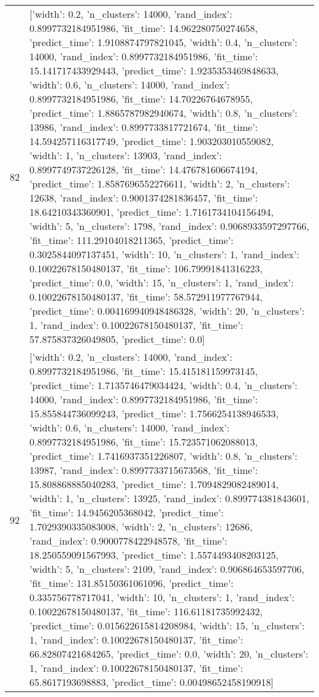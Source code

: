\begin{tabular}{rl}
82 & [{'width': 0.2, 'n_clusters': 14000, 'rand_index': 0.8997732184951986, 'fit_time': 14.962280750274658, 'predict_time': 1.9108874797821045}, {'width': 0.4, 'n_clusters': 14000, 'rand_index': 0.8997732184951986, 'fit_time': 15.141717433929443, 'predict_time': 1.9235353469848633}, {'width': 0.6, 'n_clusters': 14000, 'rand_index': 0.8997732184951986, 'fit_time': 14.70226764678955, 'predict_time': 1.8865787982940674}, {'width': 0.8, 'n_clusters': 13986, 'rand_index': 0.8997733817721674, 'fit_time': 14.594257116317749, 'predict_time': 1.903203010559082}, {'width': 1, 'n_clusters': 13903, 'rand_index': 0.8997749737226128, 'fit_time': 14.476781606674194, 'predict_time': 1.8587696552276611}, {'width': 2, 'n_clusters': 12638, 'rand_index': 0.9001374281836457, 'fit_time': 18.64210343360901, 'predict_time': 1.7161734104156494}, {'width': 5, 'n_clusters': 1798, 'rand_index': 0.9068933597297766, 'fit_time': 111.29104018211365, 'predict_time': 0.3025844097137451}, {'width': 10, 'n_clusters': 1, 'rand_index': 0.10022678150480137, 'fit_time': 106.79991841316223, 'predict_time': 0.0}, {'width': 15, 'n_clusters': 1, 'rand_index': 0.10022678150480137, 'fit_time': 58.572911977767944, 'predict_time': 0.004169940948486328}, {'width': 20, 'n_clusters': 1, 'rand_index': 0.10022678150480137, 'fit_time': 57.875837326049805, 'predict_time': 0.0}] \\
92 & [{'width': 0.2, 'n_clusters': 14000, 'rand_index': 0.8997732184951986, 'fit_time': 15.415181159973145, 'predict_time': 1.7135746479034424}, {'width': 0.4, 'n_clusters': 14000, 'rand_index': 0.8997732184951986, 'fit_time': 15.855844736099243, 'predict_time': 1.7566254138946533}, {'width': 0.6, 'n_clusters': 14000, 'rand_index': 0.8997732184951986, 'fit_time': 15.723571062088013, 'predict_time': 1.7416937351226807}, {'width': 0.8, 'n_clusters': 13987, 'rand_index': 0.8997733715673568, 'fit_time': 15.808868885040283, 'predict_time': 1.7094829082489014}, {'width': 1, 'n_clusters': 13925, 'rand_index': 0.899774381843601, 'fit_time': 14.9456205368042, 'predict_time': 1.7029390335083008}, {'width': 2, 'n_clusters': 12686, 'rand_index': 0.9000778422948578, 'fit_time': 18.250559091567993, 'predict_time': 1.5574493408203125}, {'width': 5, 'n_clusters': 2109, 'rand_index': 0.906864653597706, 'fit_time': 131.85150361061096, 'predict_time': 0.335756778717041}, {'width': 10, 'n_clusters': 1, 'rand_index': 0.10022678150480137, 'fit_time': 116.61181735992432, 'predict_time': 0.015622615814208984}, {'width': 15, 'n_clusters': 1, 'rand_index': 0.10022678150480137, 'fit_time': 66.82807421684265, 'predict_time': 0.0}, {'width': 20, 'n_clusters': 1, 'rand_index': 0.10022678150480137, 'fit_time': 65.8617193698883, 'predict_time': 0.00498652458190918}] \\

\end{tabular}

